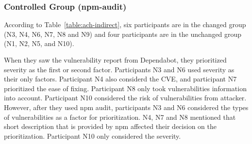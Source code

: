 \documentclass[conference]{IEEEtran}
\begin{document}
	
	
	\subsubsection{Controlled Group (npm-audit)}
	According to Table~\ref{table:ach-indirect}, six participants are in the changed group (N3, N4, N6, N7, N8 and N9) and four participants are in the unchanged group (N1, N2, N5, and N10). 
	
	
	When they saw the vulnerability report from Dependabot, they prioritized severity as the first or second factor. Participants N3 and N6 used severity as their only factors. Participant N4 also considerd the CVE, and participant N7 prioritized the ease of fixing. Participant N8 only took vulnerabilities information into account. Participant N10 considered the risk of vulnerabilities from attacker. However, after they used npm audit, participants N3 and N6 considered the types of vulnerabilities as a factor for prioritization. N4, N7 and N8 mentioned that short description that is provided by npm affected their decision on the prioritization. Participant N10 only considered the severity.
	
\end{document}
